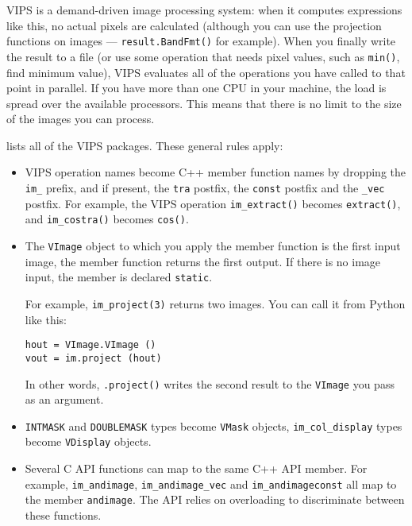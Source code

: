 VIPS is a demand-driven image processing system: when it computes expressions
like this, no actual pixels are calculated (although you can use the
projection functions on images --- \verb+result.BandFmt()+ for example).  When
you finally write the result to a file (or use some operation that needs pixel
values, such as \verb+min()+, find minimum value), VIPS evaluates all of the
operations you have called to that point in parallel. If you have more than one
CPU in your machine, the load is spread over the available processors. This
means that there is no limit to the size of the images you can process.

 lists all of the VIPS packages. These general
rules apply:

\begin{itemize}

\item
VIPS operation names become C++ member function names by dropping the
\verb+im_+ prefix, and if present, the \verb+tra+ postfix, the \verb+const+
postfix and the \verb+_vec+ postfix. For example, the
VIPS operation \verb+im_extract()+ becomes \verb+extract()+, and
\verb+im_costra()+ becomes \verb+cos()+.

\item
The \verb+VImage+ object to which you apply the member function is the first
input image, the member function returns the first output. If there is no
image input, the member is declared \verb+static+.

For example, \verb+im_project(3)+ returns two images. You can call it from
Python like this:

\begin{verbatim}
hout = VImage.VImage ()
vout = im.project (hout)
\end{verbatim}

\noindent
In other words, \verb+.project()+ writes the second result to the 
\verb+VImage+ you pass as an argument.

\item
\verb+INTMASK+ and \verb+DOUBLEMASK+ types become \verb+VMask+ objects,
\verb+im_col_display+ types become \verb+VDisplay+ objects.

\item
Several C API functions can map to the same C++ API member. For example,
\verb+im_andimage+, \verb+im_andimage_vec+ and \verb+im_andimageconst+ all map
to the member \verb+andimage+. The API relies on overloading to
discriminate between these functions.

\end{itemize}

